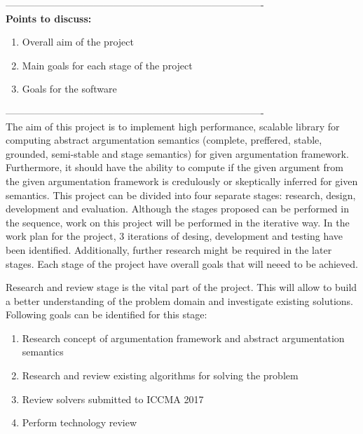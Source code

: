 
-------------------------------------------------------------------------------\\
\textbf{Points to discuss:}
\begin{enumerate}
	\item{Overall aim of the project}
	\item{Main goals for each stage of the project}
	\item{Goals for the software}
\end{enumerate}
-------------------------------------------------------------------------------\\

The aim of this project is to implement high performance, scalable library for computing abstract argumentation semantics (complete, preffered, stable, grounded, semi-stable and stage semantics) for given argumentation framework. Furthermore, it should have the ability to compute if the given argument from the given argumentation framework is credulously or skeptically inferred for given semantics.
This project can be divided into four separate stages: research, design, development and evaluation. Although the stages proposed can be performed in the sequence, work on this project will be performed in the iterative way. In the work plan for the project, 3 iterations of desing, development and testing have been identified. Additionally, further research might be required in the later stages. Each stage of the project have overall goals that will neeed to be achieved. 

Research and review stage is the vital part of the project. This will allow to build a better understanding of the problem domain and investigate existing solutions. Following goals can be identified for this stage:
\begin{enumerate}
	\item{Research concept of argumentation framework and abstract argumentation semantics}
	\item{Research and review existing algorithms for solving the problem}
	\item{Review solvers submitted to ICCMA 2017}
	\item{Perform technology review}
\end{enumerate}


